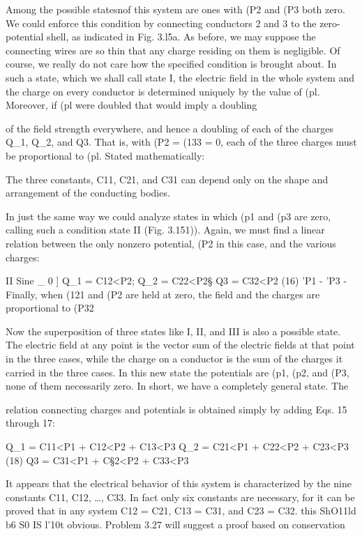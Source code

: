 Among the possible statesnof this system are ones with (P2 and (P3
both zero. We could enforce this condition by connecting conductors
2 and 3 to the zero-potential shell, as indicated in Fig. 3.l5a.
As before, we may suppose the connecting wires are so thin that any
charge residing on them is negligible. Of course, we really do not
care how the specified condition is brought about. In such a state,
which we shall call state I, the electric field in the whole system and
the charge on every conductor is determined uniquely by the value
of (pl. Moreover, if (pl were doubled that would imply a doubling

of the field strength everywhere, and hence a doubling of each of
the charges Q_1, Q_2, and Q3. That is, with (P2 = (133 = 0, each of the
three charges must be proportional to (pl. Stated mathematically:


The three constants, C11, C21, and C31 can depend only on the shape
and arrangement of the conducting bodies.

In just the same way we could analyze states in which (p1 and (p3
are zero, calling such a condition state II (Fig. 3.151)). Again, we
must find a linear relation between the only nonzero potential, (P2 in
this case, and the various charges:

II
Sine _ 0 ] Q_1 = C12<P2; Q_2 = C22<P2§ Q3 = C32<P2 (16)
'P1 - 'P3 -
Finally, when (121 and (P2 are held at zero, the field and the charges
are proportional to (P32



Now the superposition of three states like I, II, and III is also a
possible state. The electric field at any point is the vector sum of
the electric fields at that point in the three cases, while the charge on
a conductor is the sum of the charges it carried in the three cases.
In this new state the potentials are (p1, (p2, and (P3, none of them necessarily
zero. In short, we have a completely general state. The

relation connecting charges and potentials is obtained simply by
adding Eqs. 15 through 17:

Q_1 = C11<P1 + C12<P2 + C13<P3
Q_2 = C21<P1 + C22<P2 + C23<P3 (18)
Q3 = C31<P1 + C§2<P2 + C33<P3

It appears that the electrical behavior of this system is characterized
by the nine constants C11, C12, \ldots , C33. In fact only six constants
are necessary, for it can be proved that in any system
C12 = C21, C13 = C31, and C23 = C32.  this ShO11ld b6 S0 IS l'10t
obvious. Problem 3.27 will suggest a proof based on conservation

